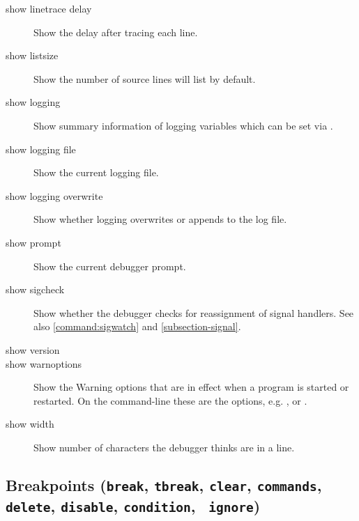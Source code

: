 \begin{description}
\item[show linetrace delay]

Show the delay after tracing each line.

\item[show listsize]

Show the number of source lines  will list by default.

\item[show logging]

Show summary information of logging variables which can be set via
.

\item[show logging file]

Show the current logging file.

\item[show logging overwrite]

Show whether logging overwrites or appends to the log file.

\item[show prompt]

Show the current debugger prompt.

\item[show sigcheck]

Show whether the debugger checks for reassignment of signal handlers.
See also \ref{command:sigwatch} and \ref{subsection-signal}.

%


\item[show version]

\item[show warnoptions]

Show the Warning options that are in effect when a program is started
or restarted. On the command-line these are the  options,
e.g. , or .

\item[show width]

Show number of characters the debugger thinks are in a line.

\end{description}

\subsection{Breakpoints ({\tt break}, {\tt tbreak}, {\tt clear},
  {\tt commands}, {\tt delete}, {\tt disable}, {\tt condition}, {\tt
  ignore})\label{subsubsection-brkpts}}

